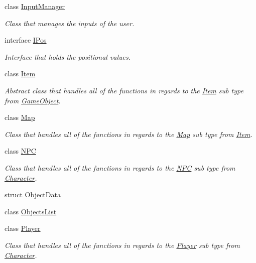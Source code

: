 \begin{DoxyCompactItemize}
class \mbox{\hyperlink{class_roguelike_r_p_g_1_1_input_manager}{Input\+Manager}}
\begin{DoxyCompactList}\small\item\em Class that manages the inputs of the user. \end{DoxyCompactList}\item 
interface \mbox{\hyperlink{interface_roguelike_r_p_g_1_1_i_pos}{I\+Pos}}
\begin{DoxyCompactList}\small\item\em Interface that holds the positional values. \end{DoxyCompactList}\item 
class \mbox{\hyperlink{class_roguelike_r_p_g_1_1_item}{Item}}
\begin{DoxyCompactList}\small\item\em Abstract class that handles all of the functions in regards to the \mbox{\hyperlink{class_roguelike_r_p_g_1_1_item}{Item}} sub type from \mbox{\hyperlink{class_roguelike_r_p_g_1_1_game_object}{Game\+Object}}. \end{DoxyCompactList}\item 
class \mbox{\hyperlink{class_roguelike_r_p_g_1_1_map}{Map}}
\begin{DoxyCompactList}\small\item\em Class that handles all of the functions in regards to the \mbox{\hyperlink{class_roguelike_r_p_g_1_1_map}{Map}} sub type from \mbox{\hyperlink{class_roguelike_r_p_g_1_1_item}{Item}}. \end{DoxyCompactList}\item 
class \mbox{\hyperlink{class_roguelike_r_p_g_1_1_n_p_c}{N\+PC}}
\begin{DoxyCompactList}\small\item\em Class that handles all of the functions in regards to the \mbox{\hyperlink{class_roguelike_r_p_g_1_1_n_p_c}{N\+PC}} sub type from \mbox{\hyperlink{class_roguelike_r_p_g_1_1_character}{Character}}. \end{DoxyCompactList}\item 
struct \mbox{\hyperlink{struct_roguelike_r_p_g_1_1_object_data}{Object\+Data}}
\item 
class \mbox{\hyperlink{class_roguelike_r_p_g_1_1_objects_list}{Objects\+List}}
\item 
class \mbox{\hyperlink{class_roguelike_r_p_g_1_1_player}{Player}}
\begin{DoxyCompactList}\small\item\em Class that handles all of the functions in regards to the \mbox{\hyperlink{class_roguelike_r_p_g_1_1_player}{Player}} sub type from \mbox{\hyperlink{class_roguelike_r_p_g_1_1_character}{Character}}. \end{DoxyCompactList}\item 

\end{DoxyCompactItemize}
